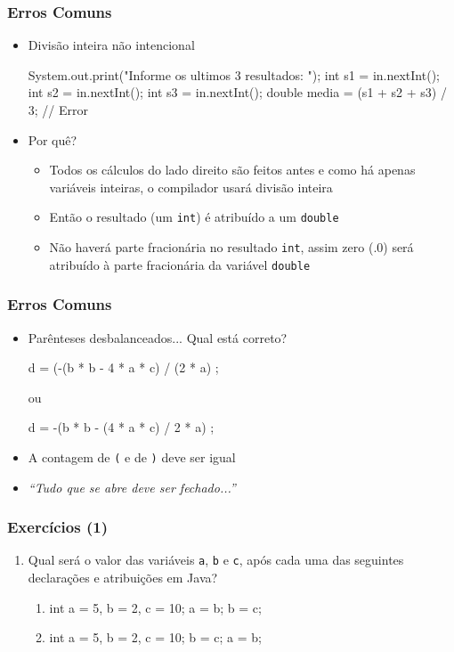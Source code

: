 \documentclass[xcolor={dvipsnames,table},aspectratio=169]{beamer}
\begin{document}
\begin{frame}[fragile]\frametitle{Erros Comuns}
\begin{itemize}
	\item Divisão inteira não intencional
\begin{javacode}
System.out.print("Informe os ultimos 3 resultados: ");
int s1 = in.nextInt();
int s2 = in.nextInt();
int s3 = in.nextInt();
double media = (s1 + s2 + s3) / 3; // Error
\end{javacode}
	\item Por quê?
	\begin{itemize}
		\item Todos os cálculos do lado direito são feitos antes e como há apenas variáveis inteiras, o compilador usará divisão inteira
		\item Então o resultado (um \texttt{int}) é atribuído a um \texttt{double}
		\item Não haverá parte fracionária no resultado \texttt{int}, assim zero (.0) será atribuído à parte fracionária da variável \texttt{double}
	\end{itemize}
\end{itemize}
\end{frame}

\begin{frame}[fragile]\frametitle{Erros Comuns}
\begin{itemize}
	\item Parênteses desbalanceados... Qual está correto?
\begin{javacode}
d = (-(b * b - 4 * a * c) / (2 * a) ;
\end{javacode}
ou
\begin{javacode}
d = -(b * b - (4 * a * c) / 2 * a) ;
\end{javacode}
	\item A contagem de \texttt{(} e de \texttt{)} deve ser igual
	\item \emph{``Tudo que se abre deve ser fechado...''}
	\end{itemize}
\end{frame}

\begin{frame}[fragile]\frametitle{Exercícios (1)}
\begin{enumerate}
	\item Qual será o valor das variáveis \texttt{a}, \texttt{b} e \texttt{c}, após cada uma das seguintes declarações e atribuições em Java?
	\begin{enumerate}[a]
		\item
\begin{javacode}
int a = 5, b = 2, c = 10;
a = b;
b = c;
\end{javacode}
		\item
\begin{javacode}
int a = 5, b = 2, c = 10;
b = c;
a = b;
\end{javacode}
	\end{enumerate}
\end{enumerate}
\end{frame}
\end{document}
